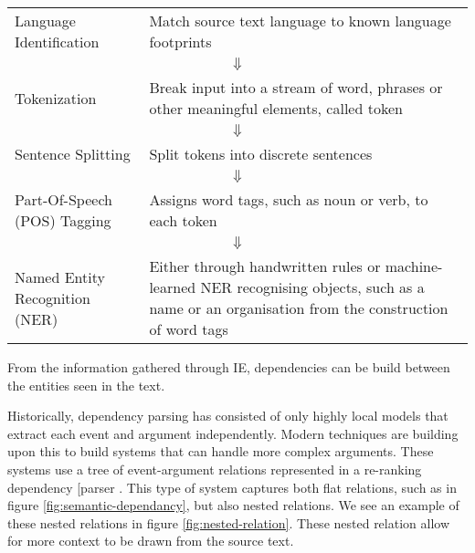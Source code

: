 \documentclass[bsc,frontabs,twoside,singlespacing,parskip,deptreport]{infthesis}     %
\begin{document}
\begin{tcolorbox}[width=\textwidth,
                  interior hidden,
                  boxsep=10pt,
                  left=0pt,
                  right=0pt,
                  top=2pt]

 \begin{tabularx}{\linewidth}{lX}

 Language Identification &  Match source text language to known language footprints\vspace{1em}\\
  \multicolumn{2}{c}{$\Downarrow$} \\
 Tokenization &  Break input into a stream of word, phrases or other meaningful elements, called token\vspace{1em}\\

  \multicolumn{2}{c}{$\Downarrow$} \\
 Sentence Splitting &  Split tokens into discrete sentences\vspace{1em}\\

  \multicolumn{2}{c}{$\Downarrow$} \\
 Part-Of-Speech (POS) Tagging &   Assigns word tags, such as noun or verb, to each token\vspace{1em} \\

  \multicolumn{2}{c}{$\Downarrow$} \\
 Named Entity Recognition (NER) &   Either through handwritten rules or machine-learned NER recognising objects, such as a name or an
    organisation from the construction of word tags

 \end{tabularx}
\end{tcolorbox}
From the information gathered through IE, dependencies can be build between the entities seen in the text.


Historically, dependency parsing has consisted of only highly local models that extract each event and argument independently.
Modern techniques are building upon this to build systems that can handle more complex arguments. These systems use a tree of
event-argument relations represented in a re-ranking dependency [parser \cite{mcclosky2011event}.
This type of system captures both flat relations, such as in figure \ref{fig:semantic-dependancy}, but also nested relations.
We see an example of these nested relations in figure \ref{fig:nested-relation}. These nested relation allow for more context to be drawn from
the source text.
\end{document}
